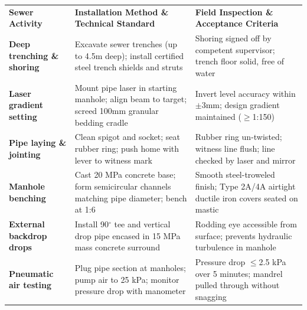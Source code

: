 \documentclass[a4paper,11pt]{article}
\begin{document}
{\fontsize{7.7pt}{9.8pt}\selectfont
\renewcommand{\arraystretch}{1.23}
\noindent
\begin{tabularx}{\textwidth}{@{}p{3.3cm} p{6.6cm} X@{}}
\rowcolor{mhnavy}
{\color{white}\bfseries Sewer Activity} & {\color{white}\bfseries Installation Method \& Technical Standard} & {\color{white}\bfseries Field Inspection \& Acceptance Criteria} \\
\rowcolor{mhbluelight}
\bfseries Deep trenching \& shoring & Excavate sewer trenches (up to 4.5m deep); install certified steel trench shields and struts & Shoring signed off by competent supervisor; trench floor solid, free of water \\
\bfseries Laser gradient setting & Mount pipe laser in starting manhole; align beam to target; screed 100mm granular bedding cradle & Invert level accuracy within $\pm$3mm; design gradient maintained ($\ge$1:150) \\
\rowcolor{mhbluelight}
\bfseries Pipe laying \& jointing & Clean spigot and socket; seat rubber ring; push home with lever to witness mark & Rubber ring un-twisted; witness line flush; line checked by laser and mirror \\
\bfseries Manhole benching & Cast 20 MPa concrete base; form semicircular channels matching pipe diameter; bench at 1:6 & Smooth steel-troweled finish; Type 2A/4A airtight ductile iron covers seated on mastic \\
\rowcolor{mhbluelight}
\bfseries External backdrop drops & Install 90$^\circ$ tee and vertical drop pipe encased in 15 MPa mass concrete surround & Rodding eye accessible from surface; prevents hydraulic turbulence in manhole \\
\bfseries Pneumatic air testing & Plug pipe section at manholes; pump air to 25 kPa; monitor pressure drop with manometer & Pressure drop $\le$2.5 kPa over 5 minutes; mandrel pulled through without snagging \\
\end{tabularx}
\renewcommand{\arraystretch}{1}
}

\vfill
\end{document}
